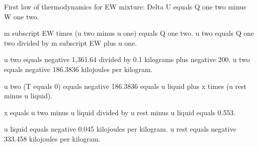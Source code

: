 First law of thermodynamics for EW mixture:  
Delta U equals Q one two minus W one two.  

m subscript EW times (u two minus u one) equals Q one two.  
u two equals Q one two divided by m subscript EW plus u one.  

u two equals negative 1,361.64 divided by 0.1 kilograms plus negative 200.  
u two equals negative 186.3836 kilojoules per kilogram.  

u two (T equals 0) equals negative 186.3836 equals u liquid plus x times (u rest minus u liquid).  

x equals u two minus u liquid divided by u rest minus u liquid equals 0.553.  

u liquid equals negative 0.045 kilojoules per kilogram.  
u rest equals negative 333.458 kilojoules per kilogram.